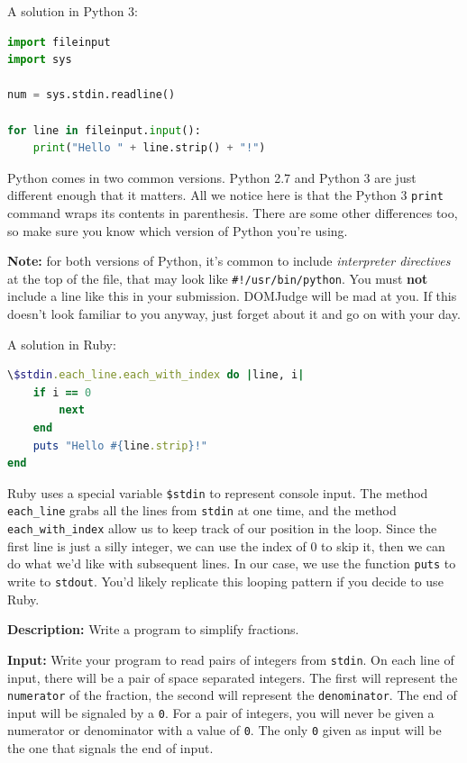 \documentclass[a4paper]{article}
\begin{document}
A solution in Python 3:
\begin{lstlisting}[language=Python]
import fileinput
import sys

num = sys.stdin.readline()

for line in fileinput.input():
    print("Hello " + line.strip() + "!")
\end{lstlisting}
Python comes in two common versions. Python 2.7 and Python 3 are just different enough that it matters. All we notice here is that the Python 3 \texttt{print} command wraps its contents in parenthesis. There are some other differences too, so make sure you know which version of Python you're using. 

\textbf{Note:} for both versions of Python, it's common to include \textit{interpreter directives} at the top of the file, that may look like \texttt{\#!/usr/bin/python}. You must \textbf{not} include a line like this in your submission. DOMJudge will be mad at you. If this doesn't look familiar to you anyway, just forget about it and go on with your day. 

A solution in Ruby:
\begin{lstlisting}[language=Ruby]
\$stdin.each_line.each_with_index do |line, i|
    if i == 0
        next
    end
    puts "Hello #{line.strip}!"
end
\end{lstlisting}

Ruby uses a special variable \texttt{\$stdin} to represent console input. The method \texttt{each\_line} grabs all the lines from \texttt{stdin} at one time, and the method \texttt{each\_with\_index} allow us to keep track of our position in the loop. Since the first line is just a silly integer, we can use the index of 0 to skip it, then we can do what we'd like with subsequent lines. In our case, we use the function \texttt{puts} to write to \texttt{stdout}. You'd likely replicate this looping pattern if you decide to use Ruby.
\newpage

\textbf{Description:} Write a program to simplify fractions.

\textbf{Input:} Write your program to read pairs of integers from \texttt{stdin}. On each line of input, there will be a pair of space separated integers. The first will represent the \texttt{numerator} of the fraction, the second will represent the \texttt{denominator}. The end of input will be signaled by a \texttt{0}. For a pair of integers, you will never be given a numerator or denominator with a value of \texttt{0}. The only \texttt{0} given as input will be the one that signals the end of input. 
\end{document}
